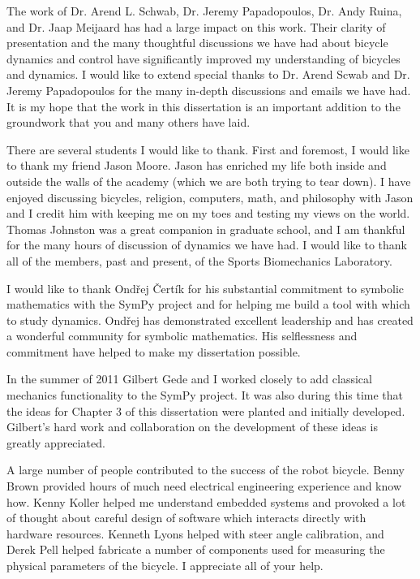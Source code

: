 The work of Dr. Arend L. Schwab, Dr. Jeremy Papadopoulos, Dr. Andy Ruina, and
Dr. Jaap Meijaard has had a large impact on this work. Their clarity of
presentation and the many thoughtful discussions we have had about bicycle
dynamics and control have significantly improved my understanding of bicycles
and dynamics. I would like to extend special thanks to Dr. Arend Scwab and Dr.
Jeremy Papadopoulos for the many in-depth discussions and emails we have had.
It is my hope that the work in this dissertation is an important addition to
the groundwork that you and many others have laid.

There are several students I would like to thank. First and foremost, I would
like to thank my friend Jason Moore. Jason has enriched my life both inside and
outside the walls of the academy (which we are both trying to tear down). I
have enjoyed discussing bicycles, religion, computers, math, and philosophy
with Jason and I credit him with keeping me on my toes and testing my views on
the world. Thomas Johnston was a great companion in graduate school, and I am
thankful for the many hours of discussion of dynamics we have had. I would like
to thank all of the members, past and present, of the Sports Biomechanics
Laboratory.

I would like to thank Ond\v{r}ej \v{C}ert\'{i}k for his substantial commitment
to symbolic mathematics with the SymPy project and for helping me build a tool
with which to study dynamics. Ond\v{r}ej has demonstrated excellent leadership
and has created a wonderful community for symbolic mathematics.  His
selflessness and commitment have helped to make my dissertation possible.

In the summer of 2011 Gilbert Gede and I worked closely to add classical
mechanics functionality to the SymPy project. It was also during this time that
the ideas for Chapter 3 of this dissertation were planted and initially
developed. Gilbert's hard work and collaboration on the development of these
ideas is greatly appreciated.

A large number of people contributed to the success of the robot bicycle. Benny
Brown provided hours of much need electrical engineering experience and know
how. Kenny Koller helped me understand embedded systems and provoked a lot of
thought about careful design of software which interacts directly with hardware
resources. Kenneth Lyons helped with steer angle calibration, and Derek Pell
helped fabricate a number of components used for measuring the physical
parameters of the bicycle. I appreciate all of your help.

